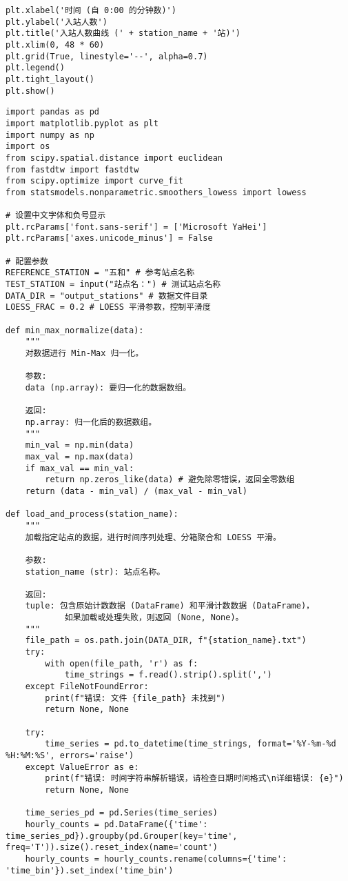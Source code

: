 \begin{lstlisting}[caption={可视化站点数据}]
plt.xlabel('时间 (自 0:00 的分钟数)')
plt.ylabel('入站人数')
plt.title('入站人数曲线 (' + station_name + '站)')
plt.xlim(0, 48 * 60)
plt.grid(True, linestyle='--', alpha=0.7)
plt.legend()
plt.tight_layout()
plt.show()
\end{lstlisting}

\begin{lstlisting}[caption={求解 $P(t)$}]
import pandas as pd
import matplotlib.pyplot as plt
import numpy as np
import os
from scipy.spatial.distance import euclidean
from fastdtw import fastdtw
from scipy.optimize import curve_fit
from statsmodels.nonparametric.smoothers_lowess import lowess

# 设置中文字体和负号显示
plt.rcParams['font.sans-serif'] = ['Microsoft YaHei']
plt.rcParams['axes.unicode_minus'] = False

# 配置参数
REFERENCE_STATION = "五和" # 参考站点名称
TEST_STATION = input("站点名：") # 测试站点名称
DATA_DIR = "output_stations" # 数据文件目录
LOESS_FRAC = 0.2 # LOESS 平滑参数，控制平滑度

def min_max_normalize(data):
    """
    对数据进行 Min-Max 归一化。

    参数:
    data (np.array): 要归一化的数据数组。

    返回:
    np.array: 归一化后的数据数组。
    """
    min_val = np.min(data)
    max_val = np.max(data)
    if max_val == min_val:
        return np.zeros_like(data) # 避免除零错误，返回全零数组
    return (data - min_val) / (max_val - min_val)

def load_and_process(station_name):
    """
    加载指定站点的数据，进行时间序列处理、分箱聚合和 LOESS 平滑。

    参数:
    station_name (str): 站点名称。

    返回:
    tuple: 包含原始计数数据 (DataFrame) 和平滑计数数据 (DataFrame)，
            如果加载或处理失败，则返回 (None, None)。
    """
    file_path = os.path.join(DATA_DIR, f"{station_name}.txt")
    try:
        with open(file_path, 'r') as f:
            time_strings = f.read().strip().split(',')
    except FileNotFoundError:
        print(f"错误: 文件 {file_path} 未找到")
        return None, None

    try:
        time_series = pd.to_datetime(time_strings, format='%Y-%m-%d %H:%M:%S', errors='raise')
    except ValueError as e:
        print(f"错误: 时间字符串解析错误，请检查日期时间格式\n详细错误: {e}")
        return None, None

    time_series_pd = pd.Series(time_series)
    hourly_counts = pd.DataFrame({'time': time_series_pd}).groupby(pd.Grouper(key='time', freq='T')).size().reset_index(name='count')
    hourly_counts = hourly_counts.rename(columns={'time': 'time_bin'}).set_index('time_bin')


\end{lstlisting}
